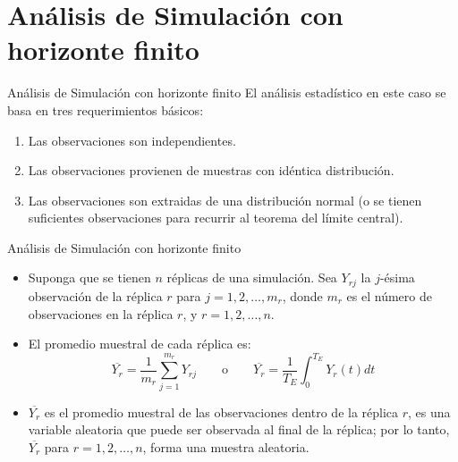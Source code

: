 \section[Horizonte finito]{Análisis de Simulación con horizonte finito}


\begin{frame}{Análisis de Simulación con horizonte finito}
    El análisis estadístico en este caso se basa en tres requerimientos básicos:
    \begin{enumerate}
        \item Las observaciones son independientes.
        \item Las observaciones provienen de muestras con idéntica distribución.
        \item Las observaciones son extraidas de una distribución normal (o se tienen suficientes observaciones para recurrir al teorema del límite central).
    \end{enumerate}
\end{frame}

\begin{frame}{Análisis de Simulación con horizonte finito}
    \begin{itemize}
        \item Suponga que se tienen $n$ réplicas de una simulación. Sea $Y_{rj}$ la $j$-ésima observación de la réplica $r$ para $j=1,2,\dots,m_r$, donde $m_r$ es el número de observaciones en la réplica $r$, y $r=1,2,\dots,n$.
        \item El promedio muestral de cada réplica es:
    \[\overline{Y_r}=\frac{1}{m_r}\sum_{j=1}^{m_r}{Y_{rj}} \qquad \text{o} \qquad \overline{Y_r}=\frac{1}{T_E}\int_{0}^{T_E}{Y_r(t) dt}\]
        \item $\overline{Y_r}$ es el promedio muestral de las observaciones dentro de la réplica $r$, es una variable aleatoria que puede ser observada al final de la réplica; por lo tanto, $\overline{Y_r}$ para $r=1,2,\dots,n$, forma una muestra aleatoria.
    \end{itemize}
\end{frame}
    

